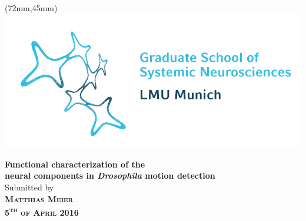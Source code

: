 \begin{titlepage}

\begin{addmargin}[-1cm]{-3.5cm}
\begin{center}

{\mySubTitle}

\begin{textblock*}{70mm}(72mm,45mm)
\centering
\vspace{20pt}
\includegraphics[width=\textwidth]{graphics/gsnlogo.pdf}
\end{textblock*}

\vspace{5.5cm}

\textbf{\LARGE Functional characterization of the }\\
\vspace{0.3cm}
\textbf{\LARGE neural components in \textit{Drosophila} motion detection}\\
\vspace{2cm}
Submitted by\\
\vspace{0.5cm}
\textbf{\large \scshape Matthias Meier}\\
\vspace{0.2cm}
\textbf{\large \scshape 5\textsuperscript{th} of April 2016}\\
\end{center}


\end{addmargin}
\end{titlepage}
